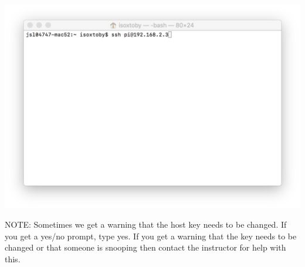 \documentclass{article}
\begin{document}
\begin{itemize}
\begin{enumerate}
  \includegraphics[width=1.00\textwidth]{termssh}
    \end{enumerate}
    
NOTE: Sometimes we get a warning that the host key needs to be changed. If you get a yes/no prompt, type yes. If you get a warning that the key needs to be changed or that someone is snooping then contact the instructor for help with this.  
\end{itemize}
\end{document}
